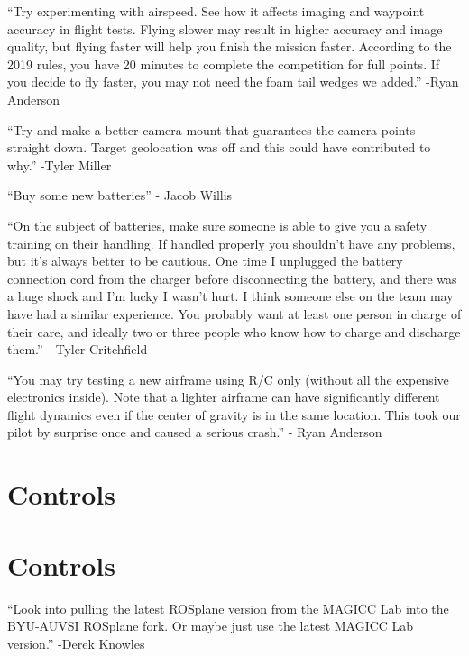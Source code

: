 \documentclass[]{auvsi_doc}
\begin{document}
{}

{``Try experimenting with airspeed. See how it affects imaging and
waypoint accuracy in flight tests. Flying slower may result in higher
accuracy and image quality, but flying faster will help you finish the
mission faster. According to the 2019 rules, you have 20 minutes to
complete the competition for full points. If you decide to fly faster,
you may not need the foam tail wedges we added.'' -Ryan Anderson}

{}

{``Try and make a better camera mount that guarantees the camera points
straight down. Target geolocation was off and this could have
contributed to why.'' -Tyler Miller}

{}

{``Buy some new batteries'' - Jacob Willis}

{}

{``On the subject of batteries, make sure someone is able to give you a
safety training on their handling. If handled properly you shouldn't
have any problems, but it's always better to be cautious. One time I
unplugged the battery connection cord from the charger before
disconnecting the battery, and there was a huge shock and I'm lucky I
wasn't hurt. I think someone else on the team may have had a similar
experience. You probably want at least one person in charge of their
care, and ideally two or three people who know how to charge and
discharge them.'' - Tyler Critchfield}

{}

{``You may try testing a new airframe using R/C only (without all the
expensive electronics inside). Note that a lighter airframe can have
significantly different flight dynamics even if the center of gravity is
in the same location. This took our pilot by surprise once and caused a
serious crash.'' - Ryan Anderson}

\section{Controls}
\hypertarget{h.juthe769iomo}{\section{\texorpdfstring{{Controls}}{Controls}}\label{h.juthe769iomo}}

{``Look into pulling the latest ROSplane version from the MAGICC Lab
into the BYU-AUVSI ROSplane fork. Or maybe just use the latest MAGICC
Lab version.'' -Derek Knowles}
\end{document}
